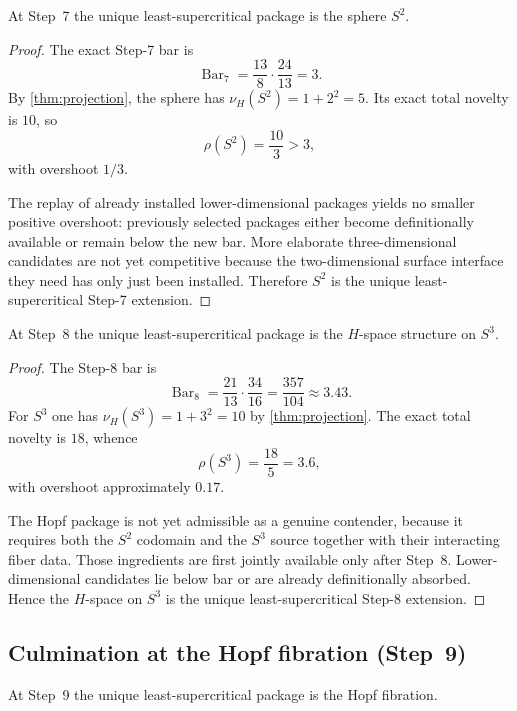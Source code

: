 \documentclass{lmcs}
\newcommand{\SelBar}{\operatorname{Bar}}
\begin{document}
\begin{prop}
\label{prop:step7}
At Step~7 the unique least-supercritical package is the sphere $S^2$.
\end{prop}

\begin{proof}
The exact Step-7 bar is
\[
  \SelBar_7 = \frac{13}{8}\cdot\frac{24}{13} = 3.
\]
By \autoref{thm:projection}, the sphere has $\nu_H(S^2)=1+2^2=5$. Its exact total novelty is $10$, so
\[
  \rho(S^2)=\frac{10}{3} > 3,
\]
with overshoot $1/3$.

The replay of already installed lower-dimensional packages yields no smaller positive overshoot: previously selected packages either become definitionally available or remain below the new bar. More elaborate three-dimensional candidates are not yet competitive because the two-dimensional surface interface they need has only just been installed. Therefore $S^2$ is the unique least-supercritical Step-7 extension.
\end{proof}

\begin{prop}
\label{prop:step8}
At Step~8 the unique least-supercritical package is the $H$-space structure on $S^3$.
\end{prop}

\begin{proof}
The Step-8 bar is
\[
  \SelBar_8 = \frac{21}{13}\cdot\frac{34}{16} = \frac{357}{104} \approx 3.43.
\]
For $S^3$ one has $\nu_H(S^3)=1+3^2=10$ by \autoref{thm:projection}. The exact total novelty is $18$, whence
\[
  \rho(S^3)=\frac{18}{5}=3.6,
\]
with overshoot approximately $0.17$.

The Hopf package is not yet admissible as a genuine contender, because it requires both the $S^2$ codomain and the $S^3$ source together with their interacting fiber data. Those ingredients are first jointly available only after Step~8. Lower-dimensional candidates lie below bar or are already definitionally absorbed. Hence the $H$-space on $S^3$ is the unique least-supercritical Step-8 extension.
\end{proof}

\subsection{Culmination at the Hopf fibration (Step~9)}

\begin{prop}
\label{prop:step9}
At Step~9 the unique least-supercritical package is the Hopf fibration.
\end{prop}
\end{document}
